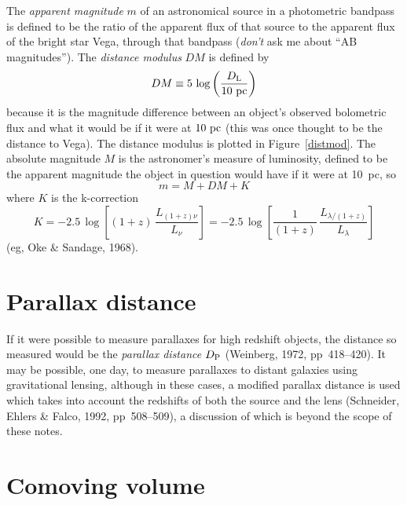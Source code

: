 The {\em apparent magnitude\/} $m$ of an astronomical source in a
photometric bandpass is defined to be the ratio of the apparent flux
of that source to the apparent flux of the bright star Vega, through
that bandpass ({\em don't\/} ask me about ``AB magnitudes'').  The
{\em distance modulus\/} $DM$ is defined by
\begin{equation}
DM\equiv 5\,\log \left(\frac{D_{\rm L}}{10~{\rm pc}}\right)
\end{equation}
because it is the magnitude difference between an object's observed
bolometric flux and what it would be if it were at $10~{\rm pc}$ (this
was once thought to be the distance to Vega).  The distance modulus is
plotted in Figure~\ref{distmod}.  The absolute magnitude $M$ is the
astronomer's measure of luminosity, defined to be the apparent
magnitude the object in question would have if it were at 10~pc, so
\begin{equation}
m=M+DM+K
\end{equation}
where $K$ is the k-correction
\begin{equation}
K = -2.5\,\log\left[(1+z)\,\frac{L_{(1+z)\nu}}{L_{\nu}}\right]=
-2.5\,\log \left[\frac{1}{(1+z)}\,\frac{L_{\lambda/(1+z)}}{L_{\lambda}}\right]
\end{equation}
(eg, Oke \& Sandage, 1968).


\section{Parallax distance}

If it were possible to measure parallaxes for high redshift objects,
the distance so measured would be the {\em parallax distance\/}
$D_{\rm P}$ (Weinberg, 1972, pp~418--420).  It may be possible, one
day, to measure parallaxes to distant galaxies using gravitational
lensing, although in these cases, a modified parallax distance is used
which takes into account the redshifts of both the source and the lens
(Schneider, Ehlers \& Falco, 1992, pp~508--509), a discussion of which
is beyond the scope of these notes.


\section{Comoving volume}

